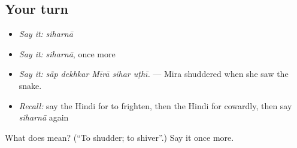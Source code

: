 \subsection*{Your turn}
\begin{itemize}
\raggedright
  \item \emph{Say it:} \emph{siharnā}
  \item \emph{Say it:} \emph{siharnā}, once more
  \item \emph{Say it:} \emph{sā̃p dekhkar Mīrā sihar uṭhī.} — Mira shuddered when she saw the snake.
  \item \emph{Recall:} say the Hindi for to frighten, then the Hindi for cowardly, then say \emph{siharnā} again
\end{itemize}

\begin{tcolorbox}[breakable,colback=teal!4,colframe=teal!35!black,title={Before you move on}]
What does  mean? (\textquotedblleft{}To shudder; to shiver\textquotedblright{}.) Say it once more.
\end{tcolorbox}
